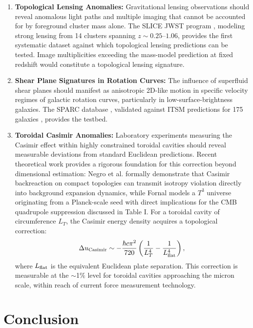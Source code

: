 \documentclass[aps,prd,11pt,onecolumn,superscriptaddress,nofootinbib,floatfix]{revtex4-2}
\begin{document}
\begin{enumerate}
\item \textbf{Topological Lensing Anomalies:} Gravitational lensing observations should reveal anomalous light paths and multiple imaging that cannot be accounted for by foreground cluster mass alone. The SLICE JWST program \cite{cerny_2025}, modeling strong lensing from 14 clusters spanning $z \sim 0.25$--$1.06$, provides the first systematic dataset against which topological lensing predictions can be tested. Image multiplicities exceeding the mass-model prediction at fixed redshift would constitute a topological lensing signature.

\item \textbf{Shear Plane Signatures in Rotation Curves:} The influence of superfluid shear planes should manifest as anisotropic 2D-like motion in specific velocity regimes of galactic rotation curves, particularly in low-surface-brightness galaxies. The SPARC database \cite{sparc_2016}, validated against ITSM predictions for 175 galaxies \cite{itsm_main}, provides the testbed.

\item \textbf{Toroidal Casimir Anomalies:} Laboratory experiments measuring the Casimir effect \cite{casimir_1948} within highly constrained toroidal cavities should reveal measurable deviations from standard Euclidean predictions. Recent theoretical work provides a rigorous foundation for this correction beyond dimensional estimation: Negro et al. \cite{negro_2026} formally demonstrate that Casimir backreaction on compact topologies can transmit isotropy violation directly into background expansion dynamics, while Fornal \cite{fornal_2026} models a $T^3$ universe originating from a Planck-scale seed with direct implications for the CMB quadrupole suppression discussed in Table I. For a toroidal cavity of circumference $L_T$, the Casimir energy density acquires a topological correction:
\begin{equation}
\Delta u_{\rm Casimir} \sim -\frac{\hbar c \pi^2}{720} \left(\frac{1}{L_T^4} - \frac{1}{L_{\rm flat}^4}\right),
\end{equation}
where $L_{\rm flat}$ is the equivalent Euclidean plate separation. This correction is measurable at the $\sim$1\% level for toroidal cavities approaching the micron scale, within reach of current force measurement technology.

\end{enumerate}

\section{Conclusion}
\label{sec:conclusion}
\end{document}
